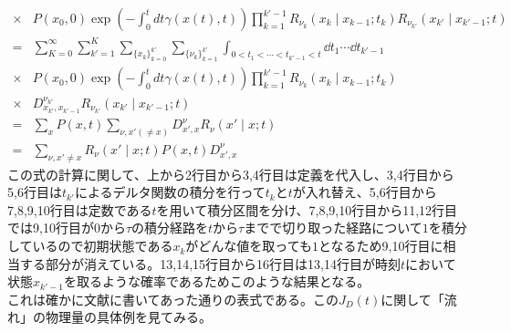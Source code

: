 \documentclass{ltjsarticle}
\begin{document}
\begin{align}
  \times&P(x_0,0)\exp\left(-\int_0^t dt\gamma\left(x(t),t\right)\right)\prod_{k=1}^{k'-1} R_{\nu_k}\left(x_k\mid x_{k-1};t_k\right)R_{\nu_{k'}}\left(x_{k'}\mid x_{k'-1};t\right)\\
  =&\sum_{K=0}^{\infty}\sum_{k'=1}^K\sum_{\lbrace x_k\rbrace_{k=0}^{k'}}\sum_{\lbrace\nu_k\rbrace_{k=1}^{k'}}\int_{0<t_1<\cdots<t_{k'-1}<t}\dd{t_1}\cdots\dd{t_{k'-1}} \\
  \times&P(x_0,0)\exp\left(-\int_0^t dt\gamma\left(x(t),t\right)\right)\prod_{k=1}^{k'-1} R_{\nu_k}\left(x_k\mid x_{k-1};t_k\right)\\
  \times&D^{\nu_{k'}}_{x_{k'},x_{k'-1}}R_{\nu_{k'}}\left(x_{k'}\mid x_{k'-1};t\right)\\
  =&\sum_{x}P(x,t)\sum_{\nu,x'(\neq x)}D^{\nu}_{x',x}R_{\nu}\left(x'\mid x;t\right)\\
  =&\sum_{\nu,x'\neq x}R_{\nu}\left(x'\mid x;t\right)P(x,t)D^{\nu}_{x',x}
  \label{eq:path_integral_JD}
\end{align}
この式の計算に関して、上から2行目から3,4行目は定義を代入し、3,4行目から5,6行目は$t_{k'}$によるデルタ関数の積分を行って$t_k$と$t$が入れ替え、5,6行目から7,8,9,10行目は定数である$t$を用いて積分区間を分け、7,8,9,10行目から11,12行目では9,10行目が$0$から$\tau$の積分経路を$t$から$\tau$までで切り取った経路について$1$を積分しているので初期状態である$x_k$がどんな値を取っても$1$となるため9,10行目に相当する部分が消えている。13,14,15行目から16行目は13,14行目が時刻$t$において状態$x_{k'-1}$を取るような確率であるためこのような結果となる。\\
これは確かに文献に書いてあった通りの表式である。この$J_D(t)$に関して「流れ」の物理量の具体例を見てみる。
\end{document}
